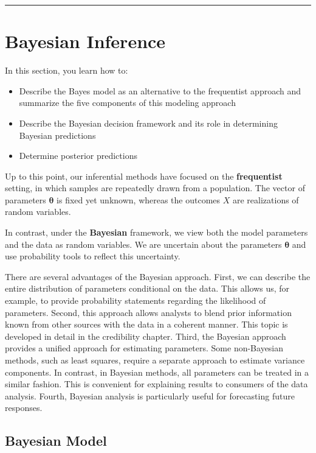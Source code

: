 \documentclass[]{book}
\providecommand{\tightlist}{%
  \setlength{\itemsep}{0pt}\setlength{\parskip}{0pt}}
\theoremstyle{definition}
\theoremstyle{definition}
\theoremstyle{definition}
\theoremstyle{remark}
\begin{document}
\begin{center}\rule{0.5\linewidth}{\linethickness}\end{center}

\section{Bayesian Inference}\label{S:BayesInference}

In this section, you learn how to:

\begin{itemize}
\tightlist
\item
  Describe the Bayes model as an alternative to the frequentist approach
  and summarize the five components of this modeling approach
\item
  Describe the Bayesian decision framework and its role in determining
  Bayesian predictions
\item
  Determine posterior predictions
\end{itemize}

Up to this point, our inferential methods have focused on the
\textbf{frequentist} setting, in which samples are repeatedly drawn from
a population. The vector of parameters \(\boldsymbol \theta\) is fixed
yet unknown, whereas the outcomes \(X\) are realizations of random
variables.

In contrast, under the \textbf{Bayesian} framework, we view both the
model parameters and the data as random variables. We are uncertain
about the parameters \(\boldsymbol \theta\) and use probability tools to
reflect this uncertainty.

There are several advantages of the Bayesian approach. First, we can
describe the entire distribution of parameters conditional on the data.
This allows us, for example, to provide probability statements regarding
the likelihood of parameters. Second, this approach allows analysts to
blend prior information known from other sources with the data in a
coherent manner. This topic is developed in detail in the credibility
chapter. Third, the Bayesian approach provides a unified approach for
estimating parameters. Some non-Bayesian methods, such as least squares,
require a separate approach to estimate variance components. In
contrast, in Bayesian methods, all parameters can be treated in a
similar fashion. This is convenient for explaining results to consumers
of the data analysis. Fourth, Bayesian analysis is particularly useful
for forecasting future responses.

\subsection{Bayesian Model}\label{bayesian-model}
\end{document}
